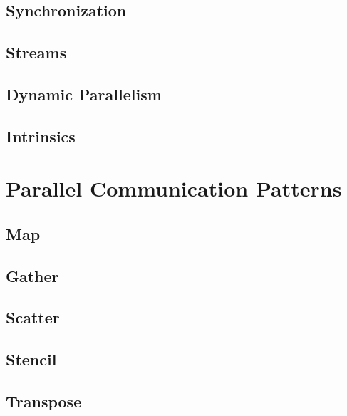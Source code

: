 \documentclass[12px,oz]{report}
\theoremstyle{indented}
\begin{document}
	\section{Synchronization}
	\label{sec-pm-synch}
	
	
	\section{Streams}
	\label{sec-pm-streams}
		
	
	\section{Dynamic Parallelism}
	\label{sec-pm-dynamic}
	
	
	\section{Intrinsics}
	\label{sec-pm-intrinsics}
	


\chapter{Parallel Communication Patterns}
\label{ch-patterns}

	
	\section{Map}
	\label{sec-map}
	
	
	\section{Gather}
	\label{sec-gather}
	
	
	\section{Scatter}
	\label{sec-scatter}
	
	
	\section{Stencil}
	\label{sec-stencil}
	
	
	\section{Transpose}
	\label{sec-transpose}
	
	
\end{document}

